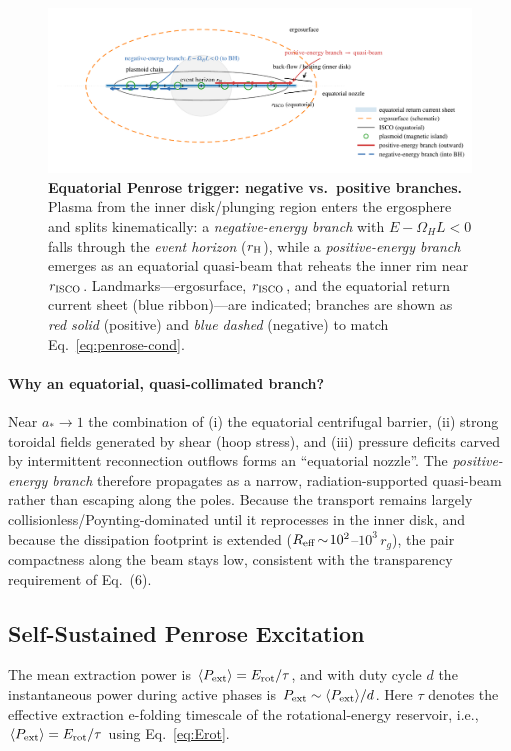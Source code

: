 \documentclass[twocolumn]{aastex701}
\begin{document}
\begin{figure}[p!]
  \centering
  \includegraphics[width=\textwidth]{fig_equatorial_trigger_schematic.pdf}
  \caption{\textbf{Equatorial Penrose trigger: negative vs.\ positive branches.}
  Plasma from the inner disk/plunging region enters the ergosphere and splits kinematically:
  a \emph{negative-energy branch} with $E-\Omega_H L<0$ falls through the \emph{event horizon} ($r_{\rm H}$),
  while a \emph{positive-energy branch} emerges as an equatorial quasi-beam that reheats the inner rim near $r_{\rm ISCO}$.
  Landmarks—ergosurface, $r_{\rm ISCO}$, and the equatorial return current sheet (blue ribbon)—are indicated; branches are shown as \emph{red solid} (positive) and \emph{blue dashed} (negative) to match Eq.~\eqref{eq:penrose-cond}.}
  \label{fig:equatorial_trigger}
\end{figure}
\FloatBarrier

\paragraph{Why an equatorial, quasi-collimated branch?}
Near $a_*\!\to\!1$ the combination of (i) the equatorial centrifugal barrier,
(ii) strong toroidal fields generated by shear (hoop stress), and
(iii) pressure deficits carved by intermittent reconnection outflows
forms an ``equatorial nozzle''. The \emph{positive-energy branch} therefore propagates as a
narrow, radiation-supported quasi-beam rather than escaping along the poles.
Because the transport remains largely collisionless/Poynting-dominated until
it reprocesses in the inner disk, and because the dissipation footprint is
extended ($R_{\rm eff}\!\sim\!10^{2}$–$10^{3}\,r_g$), the pair compactness
along the beam stays low, consistent with the transparency requirement of Eq.~(6).

\subsection{Self-Sustained Penrose Excitation}\label{sec:penrose}
The mean extraction power is $\langle P_{\rm ext}\rangle=E_{\rm rot}/\tau$, and with duty cycle $d$ the instantaneous power during active phases is $P_{\rm ext}\sim\langle P_{\rm ext}\rangle/d$. Here $\tau$ denotes the effective extraction e-folding timescale of the rotational-energy reservoir, i.e., $\langle P_{\rm ext}\rangle=E_{\rm rot}/\tau$ using Eq.~\eqref{eq:Erot}.
\end{document}

